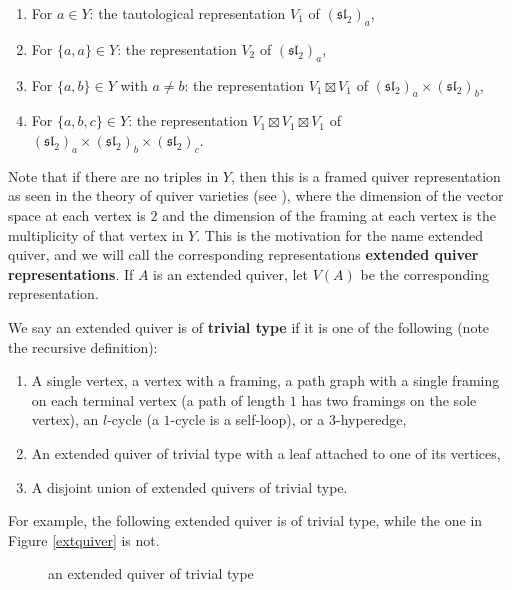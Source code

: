 \documentclass[12pt]{article}
\renewcommand{\sl}{\mathfrak{sl}}
\theoremstyle{definition}
\theoremstyle{remark}
\begin{document}
\begin{enumerate}
    \item For $a\in Y$: the tautological representation $V_1$ of $(\sl_2)_a$,
    \item For $\{a,a\}\in Y$: the representation $V_2$ of $(\sl_2)_a$,
    \item For $\{a,b\}\in Y$ with $a\neq b$: the representation $V_1\boxtimes V_1$ of $(\sl_2)_a\times(\sl_2)_b$,
    \item For $\{a,b,c\}\in Y$: the representation $V_1\boxtimes V_1\boxtimes V_1$ of $(\sl_2)_a\times(\sl_2)_b\times(\sl_2)_c$.
\end{enumerate}
Note that if there are no triples in $Y$, then this is a framed quiver representation as seen in the theory of quiver varieties (see \cite[Section 3.1]{ginzburg2009lecturesonnakajimaquivervarieties}), where the dimension of the vector space at each vertex is $2$ and the dimension of the framing at each vertex is the multiplicity of that vertex in $Y$. This is the motivation for the name extended quiver, and we will call the corresponding representations \textbf{extended quiver representations}. If $A$ is an extended quiver, let $V(A)$ be the corresponding representation.

We say an extended quiver is of \textbf{trivial type} if it is one of the following (note the recursive definition):

\begin{enumerate}
    \item A single vertex, a vertex with a framing, a path graph with a single framing on each terminal vertex (a path of length $1$ has two framings on the sole vertex), an $l$-cycle (a $1$-cycle is a self-loop), or a $3$-hyperedge,
    \item An extended quiver of trivial type with a leaf attached to one of its vertices,
    \item A disjoint union of extended quivers of trivial type.
\end{enumerate}

For example, the following extended quiver is of trivial type, while the one in Figure \ref{extquiver} is not.

\begin{figure}[H]
    \centering
    {\caption{an extended quiver of trivial type}\label{extquivertriv}}
\end{figure}
\end{document}
